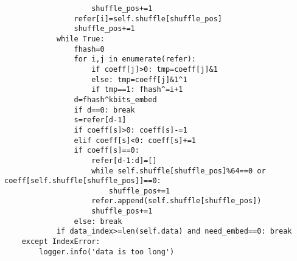 \documentclass[onecolumn,a4paper,12pt]{article}
\begin{document}
\begin{lstlisting}
                    shuffle_pos+=1
                refer[i]=self.shuffle[shuffle_pos]
                shuffle_pos+=1
            while True:
                fhash=0
                for i,j in enumerate(refer):
                    if coeff[j]>0: tmp=coeff[j]&1
                    else: tmp=coeff[j]&1^1
                    if tmp==1: fhash^=i+1
                d=fhash^kbits_embed
                if d==0: break
                s=refer[d-1]
                if coeff[s]>0: coeff[s]-=1
                elif coeff[s]<0: coeff[s]+=1
                if coeff[s]==0:
                    refer[d-1:d]=[]
                    while self.shuffle[shuffle_pos]%64==0 or coeff[self.shuffle[shuffle_pos]]==0:
                        shuffle_pos+=1
                    refer.append(self.shuffle[shuffle_pos])
                    shuffle_pos+=1
                else: break
            if data_index>=len(self.data) and need_embed==0: break
    except IndexError:
        logger.info('data is too long')
\end{lstlisting}
\end{document}
